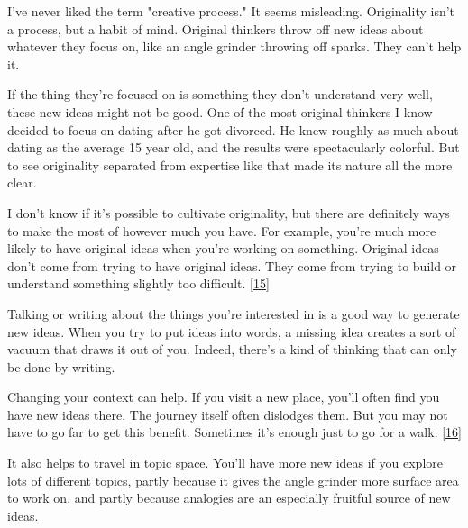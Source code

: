 I've never
                  liked the term "creative process." It seems misleading.
                  Originality isn't a process, but a habit of mind. Original
                  thinkers throw off new ideas about whatever they focus on,
                  like an angle grinder throwing off sparks. They can't help
                  it.

If the thing they're focused on is something
                  they don't understand very well, these new ideas might not be
                  good. One of the most original thinkers I know decided to
                  focus on dating after he got divorced. He knew roughly as much
                  about dating as the average 15 year old, and the results were
                  spectacularly colorful. But to see originality separated from
                  expertise like that made its nature all the more clear.

I
                  don't know if it's possible to cultivate originality, but
                  there are definitely ways to make the most of however much you
                  have. For example, you're much more likely to have original
                  ideas when you're working on something. Original ideas don't
                  come from trying to have original ideas. They come from trying
                  to build or understand something slightly too difficult.
                  [\href{\#f15n}{15}]

Talking or writing about the things you're
                  interested in is a good way to generate new ideas. When you
                  try to put ideas into words, a missing idea creates a sort of
                  vacuum that draws it out of you. Indeed, there's a kind of
                  thinking that can only be done by writing.

Changing
                  your context can help. If you visit a new place, you'll often
                  find you have new ideas there. The journey itself often
                  dislodges them. But you may not have to go far to get this
                  benefit. Sometimes it's enough just to go for a walk.
                  [\href{\#f16n}{16}]

It also helps to travel in topic space. You'll
                  have more new ideas if you explore lots of different topics,
                  partly because it gives the angle grinder more surface area to
                  work on, and partly because analogies are an especially
                  fruitful source of new ideas.

